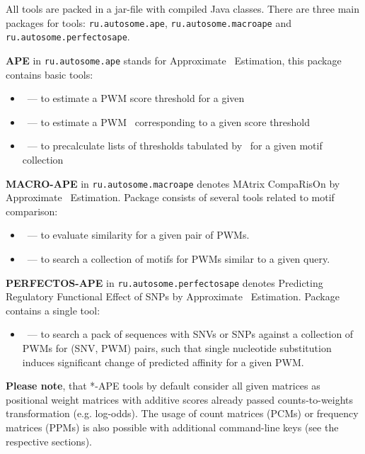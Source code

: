 All tools are packed in a jar-file with compiled Java classes. There are three main packages for tools:
\texttt{ru.autosome.ape}, \texttt{ru.autosome.macroape} and \texttt{ru.autosome.perfectosape}.

\textbf{APE} in \texttt{ru.autosome.ape} stands for Approximate \pvalue\ Estimation, this package contains basic tools:
\begin{itemize}
\item {}~--- to estimate a PWM score threshold for a given \pvalue
\item {}~--- to estimate a PWM \pvalue\ corresponding to a given score threshold
\item {}~--- to precalculate lists of thresholds tabulated by \pvalues\ for a given motif collection
\end{itemize}

\textbf{MACRO-APE} in \texttt{ru.autosome.macroape} denotes MAtrix CompaRisOn by Approximate \pvalue\ Estimation. Package consists of several tools related to motif comparison:
\begin{itemize}
\item {}~--- to evaluate similarity for a given pair of PWMs.
\item {}~--- to search a collection of motifs for PWMs similar to a given query.
\end{itemize}

\textbf{PERFECTOS-APE} in \texttt{ru.autosome.perfectosape} denotes Predicting Regulatory Functional Effect of SNPs by Approximate \pvalue\ Estimation. Package contains a single tool:
\begin{itemize}
\item{}~--- to search a pack of sequences with SNVs or SNPs against a collection of PWMs for (SNV, PWM) pairs, such that single nucleotide substitution induces significant change of predicted affinity for a given PWM.
\end{itemize}

\textbf{Please note}, that *-APE tools by default consider all given matrices as positional weight matrices with additive scores already passed counts-to-weights transformation (e.g. log-odds). The usage of count matrices (PCMs) or frequency matrices (PPMs) is also possible with additional command-line keys (see the respective sections).
